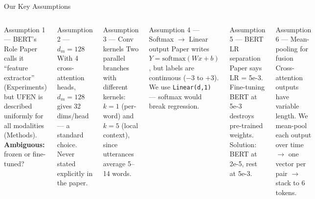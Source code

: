 \documentclass[aspectratio=169]{beamer}
\begin{document}
\begin{frame}{Our Key Assumptions}
  \vspace{-4pt}
  \begin{columns}[T]

    \begin{block}{Assumption 1 — BERT's Role}
      \footnotesize
      Paper calls it ``feature extractor'' (Experiments) but UFEN is described
      uniformly for all modalities (Methods). \textbf{Ambiguous:} frozen or fine-tuned?
    \end{block}

    \vspace{3pt}

    \begin{block}{Assumption 2 — $d_m = 128$}
      \footnotesize With 4 cross-attention heads, $d_m=128$ gives 32 dims/head —
      a standard choice. Never stated explicitly in the paper.
    \end{block}

    \vspace{3pt}

    \begin{block}{Assumption 3 — Conv kernels}
      \footnotesize
      Two parallel branches with different kernels: $k=1$ (per-word) and
      $k=5$ (local context), since utterances average 5--14 words.
    \end{block}


    \begin{block}{Assumption 4 — Softmax $\to$ Linear output}
      \footnotesize
      Paper writes $Y = \text{softmax}(Wx+b)$, but labels are continuous
      ($-3$ to $+3$). We use \texttt{Linear(d,1)} — softmax would break regression.
    \end{block}

    \vspace{3pt}

    \begin{block}{Assumption 5 — BERT LR separation}
      \footnotesize
      Paper says LR = 5e-3. Fine-tuning BERT at 5e-3 destroys pre-trained
      weights. Solution: BERT at 2e-5, rest at 5e-3.
    \end{block}

    \vspace{3pt}

    \begin{block}{Assumption 6 — Mean-pooling for fusion}
      \footnotesize
      Cross-attention outputs have variable length. We mean-pool each output
      over time $\to$ one vector per pair $\to$ stack to 6 tokens.
    \end{block}

  \end{columns}
\end{frame}
\end{document}

